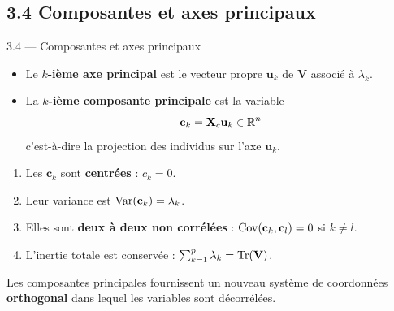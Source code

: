 \subsection{3.4 Composantes et axes principaux}
\begin{frame}{3.4 — Composantes et axes principaux}
\begin{definition}
\begin{itemize}
  \item Le \textbf{$k$-ième axe principal} est le vecteur propre $\mathbf{u}_k$
        de $\mathbf{V}$ associé à $\lambda_k$.
  \item La \textbf{$k$-ième composante principale} est la variable
        \[
          \mathbf{c}_k = \mathbf{X}_c \mathbf{u}_k \in \mathbb{R}^n
        \]
        c'est-à-dire la projection des individus sur l'axe $\mathbf{u}_k$.
\end{itemize}
\end{definition}

\begin{prop}
\begin{enumerate}
  \item Les $\mathbf{c}_k$ sont \textbf{centrées} : $\bar{c}_k = 0$.
  \item Leur variance est $\operatorname{Var}(\mathbf{c}_k) = \lambda_k$.
  \item Elles sont \textbf{deux à deux non corrélées} : $\operatorname{Cov}(\mathbf{c}_k, \mathbf{c}_l) = 0$ si $k \neq l$.
  \item L'inertie totale est conservée : $\sum_{k=1}^p \lambda_k = \operatorname{Tr}(\mathbf{V})$.
\end{enumerate}
\end{prop}

\begin{rema}
\small Les composantes principales fournissent un \alert{nouveau système de coordonnées}
\textbf{orthogonal} dans lequel les variables sont décorrélées.
\end{rema}
\end{frame}

